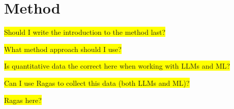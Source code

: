 



\section{Method}

\colorbox{yellow}{Should I write the introduction to the method last?}


\colorbox{yellow}{What method approach should I use?}



\colorbox{yellow}{Is quantitative data the correct here when working with LLMs
and ML?}

\colorbox{yellow}{Can I use Ragas to collect this data (both LLMs and ML)?}




\colorbox{yellow}{Ragas here?}







